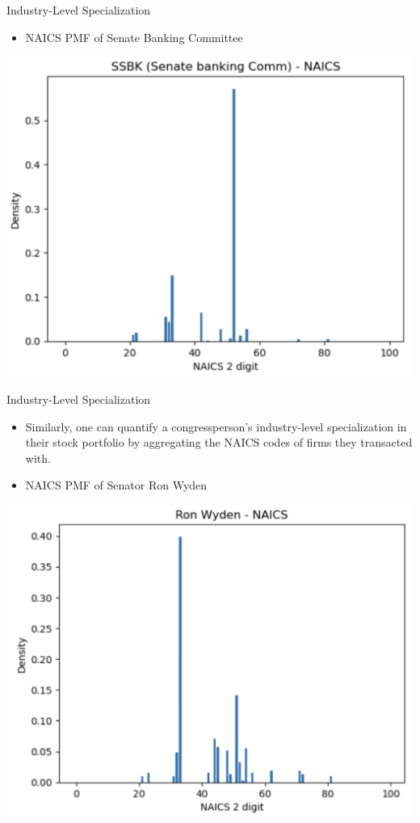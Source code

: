 \documentclass{beamer}
\begin{document}
	\begin{frame}{Industry-Level Specialization}
		\begin{itemize}
			\item NAICS PMF of Senate Banking Committee
		\end{itemize}
		\centering	\includegraphics[scale=0.3]{./images/ssbk.png}
	\end{frame}

	\begin{frame}{Industry-Level Specialization}
		\begin{itemize}
			\item Similarly, one can quantify a congressperson's industry-level specialization in their stock portfolio by aggregating the NAICS codes of firms they transacted with.
			\item NAICS PMF of Senator Ron Wyden
		\end{itemize}
		\centering	\includegraphics[scale=0.3]{./images/r.png}
	\end{frame}
\end{document}
